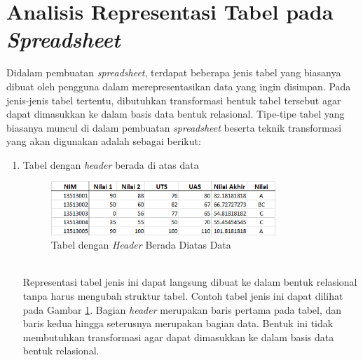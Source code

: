 \section{Analisis Representasi Tabel pada \textit{Spreadsheet}}
Didalam pembuatan \textit{spreadsheet}, terdapat beberapa jenis tabel yang biasanya dibuat oleh pengguna dalam merepresentasikan data yang ingin disimpan. Pada jenis-jenis tabel tertentu, dibutuhkan transformasi bentuk tabel tersebut agar dapat dimasukkan ke dalam basis data bentuk relasional. Tipe-tipe tabel yang biasanya muncul di dalam pembuatan \textit{spreadsheet} beserta teknik transformasi yang akan digunakan adalah sebagai berikut:
\begin{enumerate}
	\item Tabel dengan \textit{header} berada di atas data
	\begin{figure}[htbp]
	    \centering
	    \includegraphics[width=0.8\textwidth]{resources/chapter-3-tabletype-1.png}
	    \caption{Tabel dengan \textit{Header} Berada Diatas Data}
		\label{TabelTipe1}
	\end{figure}\\
	Representasi tabel jenis ini dapat langsung dibuat ke dalam bentuk relasional tanpa harus mengubah struktur tabel. Contoh tabel jenis ini dapat dilihat pada Gambar \ref{TabelTipe1}. Bagian \textit{header} merupakan baris pertama pada tabel, dan baris kedua hingga seterusnya merupakan bagian data. Bentuk ini tidak membutuhkan transformasi agar dapat dimasukkan ke dalam basis data bentuk relasional.


\end{enumerate}
